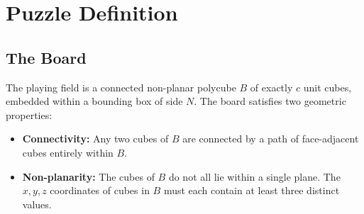 \documentclass[a4paper,UKenglish,cleveref, autoref, thm-restate]{lipics-v2021}
\begin{document}
\section{Puzzle Definition}
\label{sec:puzzle}

\subsection{The Board}

The playing field is a connected non-planar polycube $B$ of exactly $c$ unit cubes, embedded within a bounding box of side $N$. The board satisfies two geometric properties:

\begin{itemize}
    \item \textbf{Connectivity:} Any two cubes of $B$ are connected by a path of face-adjacent cubes entirely within $B$.
    \item \textbf{Non-planarity:} The cubes of $B$ do not all lie within a single plane. The $x,y,z$ coordinates of cubes in $B$ must each contain at least three distinct values.
\end{itemize}
\end{document}
